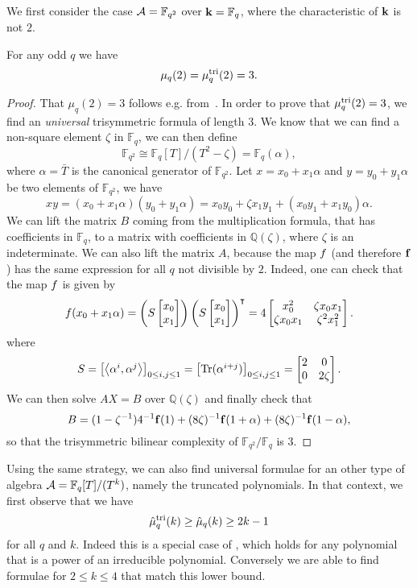 \documentclass[11pt]{article}
\begin{document}
We first consider the case $\mathcal{A}=\mathbb{F}_{q^2}$ over $\mathbf{k}=\mathbb{F}_q$, where
the characteristic of $\mathbf{k}$ is not $2$.
\begin{prop}
For any odd $q$ we have
\[
  \mu_q(2) = \mu^{\textrm{tri}}_q(2) = 3.
\]
\end{prop}
\begin{proof}
That $\mu_q(2)=3$ follows e.g. from~\cite[Theorem 2.2]{BCPRRR19}. In order to prove that
$\mu^{\textrm{tri}}_q(2) = 3$, we find an \emph{universal} trisymmetric formula of length
$3$. We know that we can find a non-square element $\zeta$ in $\mathbb{F}_q$, we
can then define
\[
  \mathbb{F}_{q^2}\cong\mathbb{F}_q[T]/(T^2-\zeta)=\mathbb{F}_{q}(\alpha),
\]
where $\alpha=\bar T$ is the canonical generator of $\mathbb{F}_{q^2}$. Let $x =
x_0 + x_1\alpha$ and $y = y_0 + y_1\alpha$ be two elements of
$\mathbb{F}_{q^2}$, we have
\[
  xy = (x_0+x_1\alpha)(y_0+y_1\alpha)=x_0y_0+\zeta x_1y_1
  +(x_0y_1+x_1y_0)\alpha.
\]
We can lift the matrix $B$ coming from
the multiplication formula, that has coefficients in $\mathbb{F}_{q}$, to a
matrix with coefficients in $\mathbb{Q}(\zeta)$, where $\zeta$ is an
indeterminate. We can also lift the matrix $A$, because the map
$f$ (and therefore $\mathbf{f}$) has the same expression for all $q$ not divisible by
$2$.
Indeed, one can check that the map $f$ is given by
\[
  f(x_0+x_1\alpha)=
  \left(S 
  \begin{bmatrix}
    x_0 \\
    x_1
  \end{bmatrix}\right)
  \left(S 
  \begin{bmatrix}
    x_0 \\
    x_1
  \end{bmatrix}\right)^\intercal
  =
  4\begin{bmatrix}
   x_0^2 & \zeta x_0x_1 \\
   \zeta x_0 x_1 & \zeta^2 x_1^2
  \end{bmatrix}.
\]
where
\[
  S =
  \begin{bmatrix}
    \left\langle\alpha^i,\alpha^j\right\rangle
  \end{bmatrix}_{0\leq i, j\leq 1}
  =
  \begin{bmatrix}
    \operatorname{Tr}(\alpha^{i+j})
  \end{bmatrix}_{0\leq i, j\leq 1}
  =
  \begin{bmatrix}
   2 & 0 \\
   0 & 2\zeta
  \end{bmatrix}.
\]
We can then solve $AX=B$ over
$\mathbb{Q}(\zeta)$ and finally check that
\[
  B = (1-\zeta^{-1})4^{-1}\mathbf{f}(1) +
  (8\zeta)^{-1}\mathbf{f}(1+\alpha)+(8\zeta)^{-1}\mathbf{f}(1-\alpha),
\]
so that the trisymmetric bilinear complexity of
$\mathbb{F}_{q^2}/\mathbb{F}_{q}$ is $3$.
\end{proof}
Using the same strategy, we can also
find universal formulae for an other type of algebra
$\mathcal{A} = \mathbb{F}_{q}[T]/(T^k)$, namely the truncated polynomials.
In that context, we first observe that we have
\[ \hat\mu^{\textrm{tri}}_q(k)\geq\hat\mu_q(k)\geq2k-1 \]
for all $q$ and $k$.
Indeed this is a special case of \cite[Thm.~4]{Winograd77},
which holds for any polynomial that is a power of an irreducible polynomial.
Conversely we
are able to find formulae for $2\leq k \leq 4$ that match this lower bound.
\end{document}
